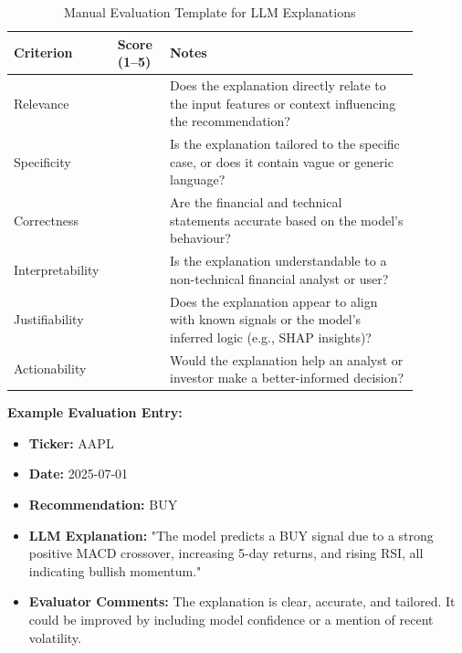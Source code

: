 \begin{table}[h]
  \centering
  \caption{Manual Evaluation Template for LLM Explanations}
  \label{tab:llm_eval_template}
  \begin{tabular}{|p{0.18\linewidth}|p{0.12\linewidth}|p{0.58\linewidth}|}
    \hline
    \textbf{Criterion} & \textbf{Score (1–5)} & \textbf{Notes} \\
    \hline
    Relevance &  & Does the explanation directly relate to the input features or context influencing the recommendation? \\
    \hline
    Specificity &  & Is the explanation tailored to the specific case, or does it contain vague or generic language? \\
    \hline
    Correctness &  & Are the financial and technical statements accurate based on the model's behaviour? \\
    \hline
    Interpretability &  & Is the explanation understandable to a non-technical financial analyst or user? \\
    \hline
    Justifiability &  & Does the explanation appear to align with known signals or the model’s inferred logic (e.g., SHAP insights)? \\
    \hline
    Actionability &  & Would the explanation help an analyst or investor make a better-informed decision? \\
    \hline
  \end{tabular}
\end{table}

\vspace{0.5cm}

\noindent
\textbf{Example Evaluation Entry:}

\begin{itemize}
  \item \textbf{Ticker:} AAPL  
  \item \textbf{Date:} 2025-07-01  
  \item \textbf{Recommendation:} BUY  
  \item \textbf{LLM Explanation:} "The model predicts a BUY signal due to a strong positive MACD crossover, increasing 5-day returns, and rising RSI, all indicating bullish momentum."
  \item \textbf{Evaluator Comments:} The explanation is clear, accurate, and tailored. It could be improved by including model confidence or a mention of recent volatility.
\end{itemize}

\medskip

